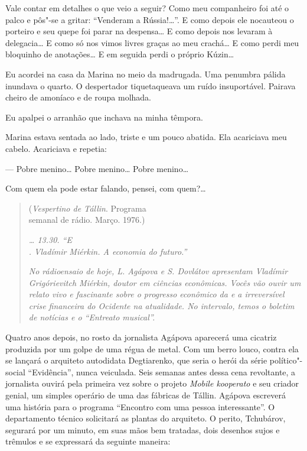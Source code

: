 Vale contar em detalhes o que veio a seguir? Como meu companheiro foi
até o palco e pôs"-se a gritar: ``Venderam a Rússia!\ldots{}''. E como depois
ele nocauteou o porteiro e seu quepe foi parar na despensa\ldots{} E como
depois nos levaram à delegacia\ldots{} E como só nos vimos livres graças ao
meu crachá\ldots{} E como perdi meu bloquinho de anotações\ldots{} E em seguida
perdi o próprio Kúzin\ldots{}

\bigskip

Eu acordei na casa da Marina no meio da madrugada. Uma penumbra pálida
inundava o quarto. O despertador tiquetaqueava um ruído insuportável.
Pairava cheiro de amoníaco e de roupa molhada.

Eu apalpei o arranhão que inchava na minha têmpora.

Marina estava sentada ao lado, triste e um pouco abatida. Ela acariciava
meu cabelo. Acariciava e repetia:

--- Pobre menino\ldots{} Pobre menino\ldots{} Pobre menino\ldots{}

Com quem ela pode estar falando, pensei, com quem?\ldots{}

\clearpage
\thispagestyle{empty}

\movetooddpage
\begin{center}
{}
\end{center}

\begin{quotation}
\begin{flushright}
(\emph{Vespertino de Tállin}. Programa\\semanal de rádio. Março. 1976.)
\end{flushright}
\vspace{4pt}
\hspace{-10pt}\emph{\ldots{} 13.30. ``E
\\. Vladímir
Miérkin. A economia do futuro.''}

\emph{No rádioensaio de hoje, L. Agápova e S. Dovlátov apresentam
Vladímir Grigórievitch Miérkin, doutor em ciências econômicas. Vocês vão
ouvir um relato vivo e fascinante sobre o progresso econômico da  e
a irreversível crise financeira do Ocidente na atualidade. No intervalo,
temos o boletim de notícias e o ``Entreato musical''.}
\end{quotation}

Quatro anos depois, no rosto da jornalista Agápova aparecerá uma
cicatriz produzida por um golpe de uma régua  de metal. Com um berro
louco, contra ela se lançará o arquiteto autodidata Degtiarenko, que
seria o herói da série político"-social ``Evidência'', nunca
veiculada. Seis semanas antes dessa cena revoltante, a jornalista ouvirá
pela primeira vez sobre o projeto \emph{Mobile kooperato} e seu criador
genial, um simples operário de uma das fábricas de Tállin. Agápova
escreverá uma história para o programa ``Encontro com uma pessoa
interessante''. O departamento técnico solicitará as plantas do
arquiteto. O perito, Tchubárov, segurará por um minuto, em suas mãos bem
tratadas, dois desenhos sujos e trêmulos e se expressará da seguinte
maneira:

